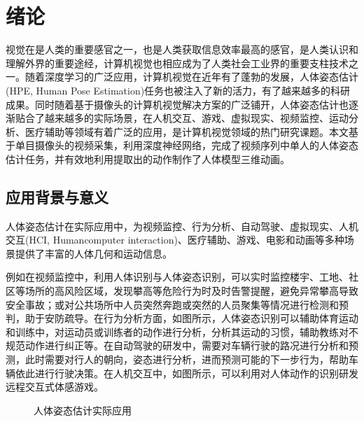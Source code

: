 
\chapter{绪论}

视觉在是人类的重要感官之一，也是人类获取信息效率最高的感官，是人类认识和理解外界的重要途经，计算机视觉也相应成为了人类社会工业界的重要支柱技术之一。随着深度学习的广泛应用，计算机视觉在近年有了蓬勃的发展，人体姿态估计(HPE, Human Pose Estimation)任务也被注入了新的活力，有了越来越多的科研成果。同时随着基于摄像头的计算机视觉解决方案的广泛铺开，人体姿态估计也逐渐贴合了越来越多的实际场景，在人机交互、游戏、虚拟现实、视频监控、运动分析、医疗辅助等领域有着广泛的应用，是计算机视觉领域的热门研究课题。本文基于单目摄像头的视频采集，利用深度神经网络，完成了视频序列中单人的人体姿态估计任务，并有效地利用提取出的动作制作了人体模型三维动画。



\section{应用背景与意义}


人体姿态估计在实际应用中，为视频监控、行为分析、自动驾驶、虚拟现实、人机交互(HCI, Humancomputer interaction)、医疗辅助、游戏、电影和动画等多种场景提供了丰富的人体几何和运动信息。

例如在视频监控中，利用人体识别与人体姿态识别，可以实时监控楼宇、工地、社区等场所的高风险区域，发现攀高等危险行为时及时告警提醒，避免异常攀高导致安全事故；或对公共场所中人员突然奔跑或突然的人员聚集等情况进行检测和预判，助于安防疏导。在行为分析方面，如图所示，人体姿态识别可以辅助体育运动和训练中，对运动员或训练者的动作进行分析，分析其运动的习惯，辅助教练对不规范动作进行纠正等。在自动驾驶的研发中，需要对车辆行驶的路况进行分析和预测，此时需要对行人的朝向，姿态进行分析，进而预测可能的下一步行为，帮助车辆依此进行行驶决策。在人机交互中，如图所示，可以利用对人体动作的识别研发远程交互式体感游戏。

\begin{figure}[h!]
  \centering
  \caption{人体姿态估计实际应用}
\end{figure}

